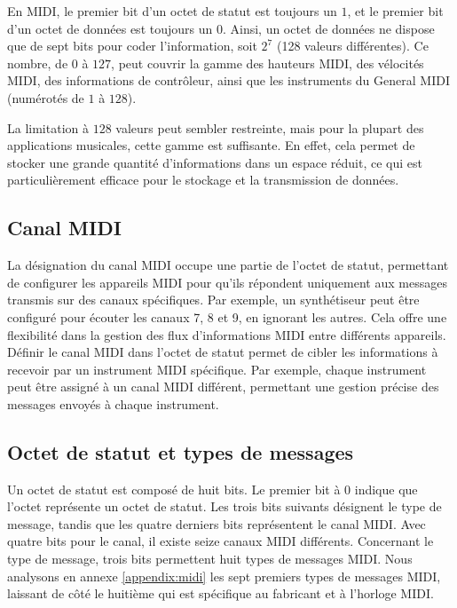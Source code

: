 En MIDI, le premier bit d'un octet de statut est toujours un $1$, et le premier bit d'un octet de données est toujours un $0$. Ainsi, un octet de données ne dispose que de sept bits pour coder l'information, soit $2^7$ (128 valeurs différentes). Ce nombre, de $0$ à $127$, peut couvrir la gamme des hauteurs MIDI, des vélocités MIDI, des informations de contrôleur, ainsi que les instruments du General MIDI (numérotés de $1$ à $128$).

La limitation à $128$ valeurs peut sembler restreinte, mais pour la plupart des applications musicales, cette gamme est suffisante. En effet, cela permet de stocker une grande quantité d'informations dans un espace réduit, ce qui est particulièrement efficace pour le stockage et la transmission de données.


\subsection*{Canal MIDI}

La désignation du canal MIDI occupe une partie de l'octet de statut, permettant de configurer les appareils MIDI pour qu'ils répondent uniquement aux messages transmis sur des canaux spécifiques. Par exemple, un synthétiseur peut être configuré pour écouter les canaux 7, 8 et 9, en ignorant les autres. Cela offre une flexibilité dans la gestion des flux d'informations MIDI entre différents appareils. Définir le canal MIDI dans l'octet de statut permet de cibler les informations à recevoir par un instrument MIDI spécifique. Par exemple, chaque instrument peut être assigné à un canal MIDI différent, permettant une gestion précise des messages envoyés à chaque instrument.

\subsection*{Octet de statut et types de messages}

Un octet de statut est composé de huit bits. Le premier bit à $0$ indique que l'octet représente un octet de statut. Les trois bits suivants désignent le type de message, tandis que les quatre derniers bits représentent le canal MIDI. Avec quatre bits pour le canal, il existe seize canaux MIDI différents. Concernant le type de message, trois bits permettent huit types de messages MIDI. Nous analysons en annexe \ref{appendix:midi} les sept premiers types de messages MIDI, laissant de côté le huitième qui est spécifique au fabricant et à l'horloge MIDI.

